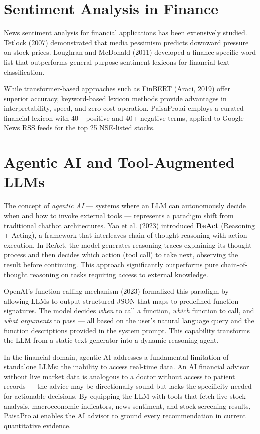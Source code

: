 \documentclass[12pt, a4paper, oneside]{report}
\newcommand{\projectname}{PaisaPro.ai}
\begin{document}
\section{Sentiment Analysis in Finance}
\label{sec:lit_sentiment}

News sentiment analysis for financial applications has been extensively studied. Tetlock (2007) demonstrated that media pessimism predicts downward pressure on stock prices. Loughran and McDonald (2011) developed a finance-specific word list that outperforms general-purpose sentiment lexicons for financial text classification.

While transformer-based approaches such as FinBERT (Araci, 2019) offer superior accuracy, keyword-based lexicon methods provide advantages in interpretability, speed, and zero-cost operation. \projectname{} employs a curated financial lexicon with 40+ positive and 40+ negative terms, applied to Google News RSS feeds for the top 25 NSE-listed stocks.

\section{Agentic AI and Tool-Augmented LLMs}
\label{sec:lit_agentic}

The concept of \textit{agentic AI} --- systems where an LLM can autonomously decide when and how to invoke external tools --- represents a paradigm shift from traditional chatbot architectures. Yao et al. (2023) introduced \textbf{ReAct} (Reasoning + Acting), a framework that interleaves chain-of-thought reasoning with action execution. In ReAct, the model generates reasoning traces explaining its thought process and then decides which action (tool call) to take next, observing the result before continuing. This approach significantly outperforms pure chain-of-thought reasoning on tasks requiring access to external knowledge.

OpenAI's function calling mechanism (2023) formalized this paradigm by allowing LLMs to output structured JSON that maps to predefined function signatures. The model decides \textit{when} to call a function, \textit{which} function to call, and \textit{what arguments} to pass --- all based on the user's natural language query and the function descriptions provided in the system prompt. This capability transforms the LLM from a static text generator into a dynamic reasoning agent.

In the financial domain, agentic AI addresses a fundamental limitation of standalone LLMs: the inability to access real-time data. An AI financial advisor without live market data is analogous to a doctor without access to patient records --- the advice may be directionally sound but lacks the specificity needed for actionable decisions. By equipping the LLM with tools that fetch live stock analysis, macroeconomic indicators, news sentiment, and stock screening results, \projectname{} enables the AI advisor to ground every recommendation in current quantitative evidence.
\end{document}

